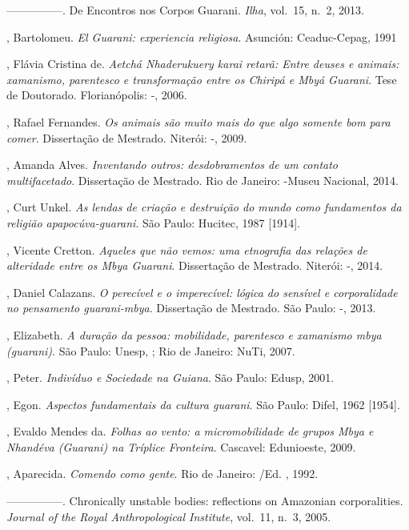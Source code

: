 {{\begin{Parskip}
—————. De Encontros nos Corpos Guarani. \emph{Ilha}, vol.~15, n.~2, 2013.

, Bartolomeu. \emph{El Guarani: experiencia religiosa}. Asunción:
Ceaduc-Cepag, 1991

, Flávia Cristina de. \emph{Aetchá Nhaderukuery karai retarã: Entre
deuses e animais: xamanismo, parentesco e transformação entre os
Chiripá e Mbyá Guarani}. Tese de Doutorado. Florianópolis: -,
2006.

 , Rafael Fernandes. \emph{Os animais são muito mais do que algo
somente bom para comer}. Dissertação de Mestrado. Niterói: -,
2009.

, Amanda Alves. \emph{Inventando outros: desdobramentos de um contato
multifacetado}. Dissertação de Mestrado. Rio de Janeiro: -Museu
Nacional, 2014.

, Curt Unkel. \emph{As lendas de criação e destruição do mundo como
fundamentos da religião apapocúva-guarani}. São Paulo: Hucitec, 1987
[1914].

, Vicente Cretton. \emph{Aqueles que não vemos: uma etnografia das
relações de alteridade entre os Mbya Guarani}. Dissertação de Mestrado.
Niterói: -, 2014.

, Daniel Calazans. \emph{O perecível e o imperecível: lógica do sensível
e corporalidade no pensamento guarani-mbya}. Dissertação de Mestrado.
São Paulo: -, 2013.

, Elizabeth. \emph{A duração da pessoa: mobilidade, parentesco e
xamanismo mbya (guarani)}. São Paulo: Unesp, ; Rio de Janeiro: NuTi,
2007.

, Peter. \emph{Indivíduo e Sociedade na Guiana}. São Paulo: Edusp, 2001.

, Egon. \emph{Aspectos fundamentais da cultura guarani}. São Paulo:
Difel, 1962 [1954]. 

, Evaldo Mendes da. \emph{Folhas ao vento: a micromobilidade de grupos
Mbya e Nhandéva (Guarani) na Tríplice Fronteira}. Cascavel: Edunioeste,
2009.

, Aparecida. \emph{Comendo como gente}. Rio de Janeiro: /Ed. ,
1992.

—————. Chronically unstable bodies: reflections on Amazonian
corporalities. \emph{Journal of the Royal Anthropological Institute}, vol.~11, n.~3,
2005.


\end{Parskip}}}
